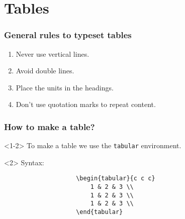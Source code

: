\documentclass{beamer}
\begin{document}
	\section{Tables}
	\begin{frame}
		\frametitle{General rules to typeset tables}
			\begin{enumerate}
				\item Never use vertical lines.
				\item Avoid double lines.
				\item Place the units in the headings.
				\item Don't use quotation marks to repeat content.
			\end{enumerate}
	\end{frame}

	\begin{frame}[fragile]
		\frametitle{How to make a table?}
		\begin{onlyenv}
			To make a table we use the \texttt{tabular} environment.
			\vfill
			\begin{visibleenv}<2>
				Syntax:
				\begin{verbatim}
					\begin{tabular}{c c c}
						1 & 2 & 3 \\
						1 & 2 & 3 \\
						1 & 2 & 3 \\
					\end{tabular}
				\end{verbatim}
			\end{visibleenv}
			\vfill
		\end{onlyenv}
	\end{frame}
\end{document}
